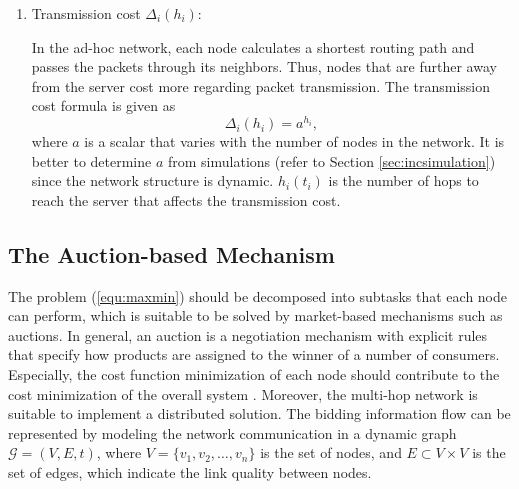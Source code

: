 \documentclass[journal]{IEEEtran}  %
\begin{document}
\begin{enumerate}
\item  Transmission cost $\Delta_i(h_i)$:

In the ad-hoc network, each node calculates a shortest routing path and  passes
the  packets through its neighbors. 
Thus, nodes that are further away from the server cost more regarding packet
transmission.    
The transmission cost formula is given as
\begin{equation}
\Delta_i(h_i) = a^{h_i},
\label{eqn:hop_advantage}
\end{equation} 
where $a$ is a scalar that varies with the number of nodes in the network.
It is better to determine $a$ from simulations (refer to Section
      \ref{sec:incsimulation}) since the network structure is dynamic. 
$h_i(t_i)$ is the number of hops to reach the server that affects the
transmission cost. 
\end{enumerate}



\subsection{The Auction-based Mechanism}
\label{sub:bidding_strategy}

The problem (\ref{equ:maxmin}) should be decomposed into subtasks that
each node can perform, which is suitable to be solved by market-based
mechanisms such as auctions. 
In general, an auction is a negotiation mechanism with explicit rules that
specify how products are assigned to the winner of a number of consumers.
Especially, the cost function minimization of each node should contribute to
the cost minimization of the overall system
\cite{dias2006market,shoham2008multiagent}.
Moreover, the multi-hop network is suitable to implement a distributed
solution. 
The bidding information flow can be represented by modeling the network
communication in a dynamic graph $\mathcal{G}=(V,E,t)$, where
$V=\{v_1,v_2,\dots,v_n\}$ is the set of nodes, and $E\subset V\times V$ is the
set of edges, which indicate the link quality between nodes. 
\end{document}
